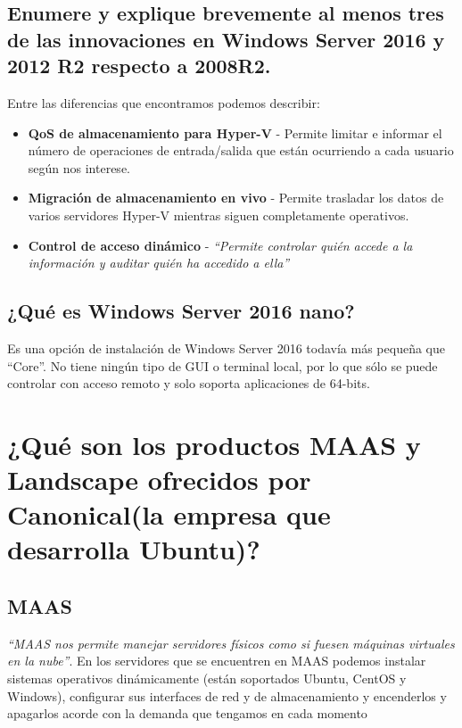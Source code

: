 \subsection{Enumere y explique brevemente al menos tres de las innovaciones en Windows Server 2016 y 2012 R2 respecto a 2008R2.}
Entre las diferencias que encontramos \cite{c3a} podemos describir:
\begin{itemize}
	\item \textbf{QoS de almacenamiento para Hyper-V} - Permite limitar e informar el número de operaciones  de entrada/salida que están ocurriendo a cada usuario según nos interese.\cite{c3a1}
	\item \textbf{Migración de almacenamiento en vivo} - Permite trasladar los datos de varios servidores Hyper-V mientras siguen completamente operativos.\cite{c3a2}
	\item \textbf{Control de acceso dinámico} - \textit{``Permite controlar quién accede a la información y auditar quién ha accedido a ella''}\cite{c3a3}
	
\end{itemize}
\subsection{¿Qué es Windows Server 2016 nano?}
Es una opción de instalación de Windows Server 2016 todavía más pequeña que ``Core''. No tiene ningún tipo de GUI o terminal local, por lo que sólo se puede controlar con acceso remoto y solo soporta aplicaciones de 64-bits.\cite{c3b}


\section{¿Qué son los productos MAAS y Landscape ofrecidos por Canonical(la empresa que desarrolla Ubuntu)?}
\subsection{MAAS}
\textit{``MAAS nos permite manejar servidores físicos como si fuesen máquinas virtuales en la nube''}\cite{c4a}. En los servidores que se encuentren en MAAS podemos instalar sistemas operativos dinámicamente (están soportados Ubuntu, CentOS y Windows), configurar sus interfaces de red y de almacenamiento  y encenderlos y apagarlos acorde con la demanda que tengamos en cada momento \cite{c4a1}
